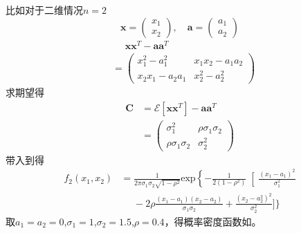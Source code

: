    比如对于二维情况$n=2$
    \begin{equation*}
        \bm x=\begin{pmatrix}x_1\\x_2\end{pmatrix},\hspace{1em}\bm a=\begin{pmatrix}a_1\\a_2\end{pmatrix}
    \end{equation*}
    \vspace{-2ex}
    \begin{equation*}
        \begin{split}
            &\phantom{=}\bm{xx}^T-\bm{aa}^T\\
            &=\begin{pmatrix}
                x_1^2-a_1^2&x_1x_2-a_1a_2\\x_2x_1-a_2a_1&x_2^2-a_2^2
            \end{pmatrix}
        \end{split}
    \end{equation*}
    求期望得
    \begin{equation}
        \begin{split}
            \bm C   &=\mathscr{E}[\bm{xx}^T]-\bm{aa}^T\\
                    &=\begin{pmatrix}
                        \sigma_1^2&\rho\sigma_1\sigma_2\\
                        \rho\sigma_1\sigma_2&\sigma_2^2
                    \end{pmatrix}
        \end{split}
    \end{equation}
    带入到得
    \begin{equation}
        \begin{split}
            f_2(x_1,x_2)    &=\frac{1}{2\pi \sigma_1\sigma_2\sqrt{1-\rho^2}}\text{exp}\left\{-\frac{1}{2(1-\rho^2)}\right[\frac{(x_1-a_1)^2}{\sigma_1^2}\\
                            &\phantom{=}-2\rho\frac{(x_1-a_1)(x_2-a_2)}{\sigma_1\sigma_2}+\frac{(x_2-a_2^2)^2}{\sigma_2^2}\bigg]\bigg\}
        \end{split}
    \end{equation}
    取$a_1=a_2=0$,$\sigma_1=1$,$\sigma_2=1.5$,$\rho=0.4$，得概率密度函数如。
    
